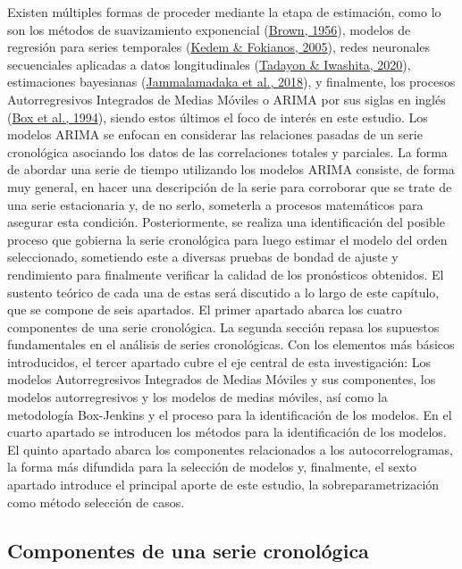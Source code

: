 \documentclass[
]{article}
\begin{document}
Existen múltiples formas de proceder mediante la etapa de estimación,
como lo son los métodos de suavizamiento exponencial
(\protect\hyperlink{ref-brown}{Brown, 1956}), modelos de regresión para
series temporales (\protect\hyperlink{ref-kedem}{Kedem \& Fokianos,
2005}), redes neuronales secuenciales aplicadas a datos longitudinales
(\protect\hyperlink{ref-redes}{Tadayon \& Iwashita, 2020}), estimaciones
bayesianas (\protect\hyperlink{ref-bayes}{Jammalamadaka et al., 2018}),
y finalmente, los procesos Autorregresivos Integrados de Medias Móviles
o ARIMA por sus siglas en inglés
(\protect\hyperlink{ref-box-jenkins}{Box et al., 1994}), siendo estos
últimos el foco de interés en este estudio. Los modelos ARIMA se enfocan
en considerar las relaciones pasadas de un serie cronológica asociando
los datos de las correlaciones totales y parciales. La forma de abordar
una serie de tiempo utilizando los modelos ARIMA consiste, de forma muy
general, en hacer una descripción de la serie para corroborar que se
trate de una serie estacionaria y, de no serlo, someterla a procesos
matemáticos para asegurar esta condición. Posteriormente, se realiza una
identificación del posible proceso que gobierna la serie cronológica
para luego estimar el modelo del orden seleccionado, sometiendo este a
diversas pruebas de bondad de ajuste y rendimiento para finalmente
verificar la calidad de los pronósticos obtenidos. El sustento teórico
de cada una de estas será discutido a lo largo de este capítulo, que se
compone de seis apartados. El primer apartado abarca los cuatro
componentes de una serie cronológica. La segunda sección repasa los
supuestos fundamentales en el análisis de series cronológicas. Con los
elementos más básicos introducidos, el tercer apartado cubre el eje
central de esta investigación: Los modelos Autorregresivos Integrados de
Medias Móviles y sus componentes, los modelos autorregresivos y los
modelos de medias móviles, así como la metodología Box-Jenkins y el
proceso para la identificación de los modelos. En el cuarto apartado se
introducen los métodos para la identificación de los modelos. El quinto
apartado abarca los componentes relacionados a los autocorrelogramas, la
forma más difundida para la selección de modelos y, finalmente, el sexto
apartado introduce el principal aporte de este estudio, la
sobreparametrización como método selección de casos.

\subsection{Componentes de una serie cronológica}
\end{document}
